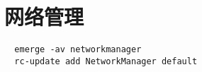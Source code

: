 \chapter{网络管理}
\begin{lstlisting}
  emerge -av networkmanager
  rc-update add NetworkManager default
\end{lstlisting}
